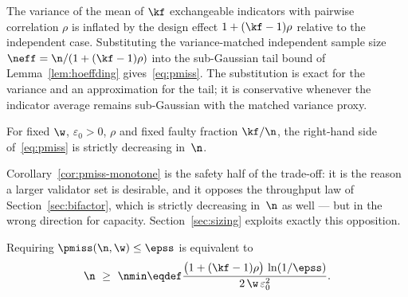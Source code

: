 \begin{Proof}
The variance of the mean of $\kf$ exchangeable indicators with pairwise
correlation $\rho$ is inflated by the design effect $1+(\kf-1)\rho$ relative to
the independent case. Substituting the variance-matched independent sample size
$\neff=\n/(1+(\kf-1)\rho)$ into the sub-Gaussian tail bound of
Lemma~\ref{lem:hoeffding} gives~\eqref{eq:pmiss}. The substitution is exact for
the variance and an approximation for the tail; it is conservative whenever the
indicator average remains sub-Gaussian with the matched variance proxy.
\end{Proof}

\begin{Corollary}[Monotonicity in $\n$]
\label{cor:pmiss-monotone}
For fixed $\w$, $\varepsilon_{0}>0$, $\rho$ and fixed faulty fraction
$\kf/\n$, the right-hand side of~\eqref{eq:pmiss} is strictly decreasing
in~$\n$.
\end{Corollary}

Corollary~\ref{cor:pmiss-monotone} is the safety half of the trade-off: it is
the reason a larger validator set is desirable, and it opposes the throughput
law of Section~\ref{sec:bifactor}, which is strictly decreasing in~$\n$ as
well --- but in the wrong direction for capacity. Section~\ref{sec:sizing}
exploits exactly this opposition.

\begin{Corollary}
\label{cor:nmin}
Requiring $\pmiss(\n,\w)\le\epss$ is equivalent to
\begin{equation}
\n\ \ge\ \nmin
\eqdef\frac{\bigl(1+(\kf-1)\rho\bigr)\,\ln(1/\epss)}
            {2\,\w\,\varepsilon_{0}^{2}} .
\label{eq:nmin}
\end{equation}
\end{Corollary}
